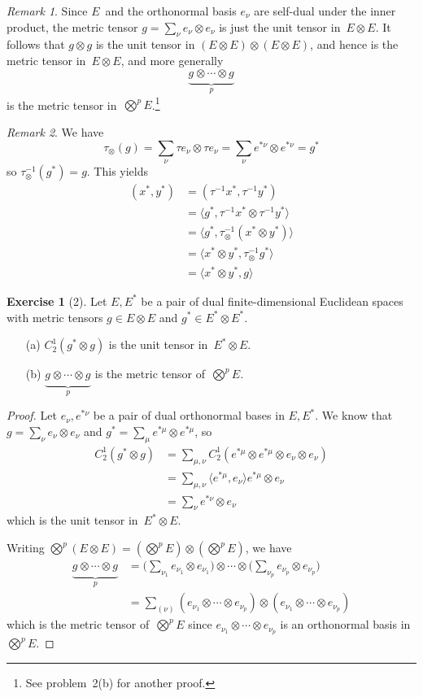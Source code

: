 \documentclass[letterpaper,12pt]{article}
\newcommand{\tprod}{\otimes}
\newcommand{\bigtprod}{\bigotimes}
\newcommand{\medtprod}{{\textstyle\bigtprod}}
\newcommand{\sprod}[2]{\langle#1,#2\rangle}
\newcommand{\iprod}[2]{(#1,#2)}
\newcommand{\multi}[4]{#2_{#3}#1\cdots#1#2_{#4}}
\newcommand{\tprods}[3]{\multi{\tprod}{#1}{#2}{#3}}
\theoremstyle{definition}
\newtheorem*{exer}{Exercise}
\theoremstyle{remark}
\newtheorem*{rmk}{Remark}
\begin{document}
\begin{rmk}
Since \(E\)~and the orthonormal basis \(e_{\nu}\) are self-dual under the inner product, the metric tensor \(g=\sum_{\nu}e_{\nu}\tprod e_{\nu}\) is just the unit tensor in~\(E\tprod E\). It follows that \(g\tprod g\) is the unit tensor in \((E\tprod E)\tprod(E\tprod E)\), and hence is the metric tensor in~\(E\tprod E\), and more generally
\[\underbrace{\tprods{g}{}{}}_p\]
is the metric tensor in~\(\medtprod^p E\).\footnote{See problem~2(b) for another proof.}
\end{rmk}

\begin{rmk}
We have
\[\tau_{\tprod}(g)=\sum_{\nu}\tau e_{\nu}\tprod\tau e_{\nu}=\sum_{\nu}e^{*\nu}\tprod e^{*\nu}=g^*\]
so \(\tau_{\tprod}^{-1}(g^*)=g\). This yields
\begin{align*}
\iprod{x^*}{y^*}&=\iprod{\tau^{-1}x^*}{\tau^{-1}y^*}\\
	&=\sprod{g^*}{\tau^{-1}x^*\tprod\tau^{-1}y^*}\\
	&=\sprod{g^*}{\tau_{\tprod}^{-1}(x^*\tprod y^*)}\\
	&=\sprod{x^*\tprod y^*}{\tau_{\tprod}^{-1}g^*}\\
	&=\sprod{x^*\tprod y^*}{g}
\end{align*}
\end{rmk}

\begin{exer}[2]
Let \(E,E^*\) be a pair of dual finite-dimensional Euclidean spaces with metric tensors \(g\in E\tprod E\) and \(g^*\in E^*\tprod E^*\).
\begin{enumerate}
\item[(a)] \(C^1_2(g^*\tprod g)\) is the unit tensor in~\(E^*\tprod E\).
\item[(b)] \(\underbrace{\tprods{g}{}{}}_p\) is the metric tensor of~\(\medtprod^p E\).
\end{enumerate}
\end{exer}
\begin{proof}
Let \(e_{\nu},e^{*\nu}\) be a pair of dual orthonormal bases in \(E,E^*\). We know that \(g=\sum_{\nu}e_{\nu}\tprod e_{\nu}\) and \(g^*=\sum_{\mu}e^{*\mu}\tprod e^{*\mu}\), so
\begin{align*}
C^1_2(g^*\tprod g)&=\sum_{\mu,\nu}C^1_2(e^{*\mu}\tprod e^{*\mu}\tprod e_{\nu}\tprod e_{\nu})\\
	&=\sum_{\mu,\nu}\sprod{e^{*\mu}}{e_{\nu}}e^{*\mu}\tprod e_{\nu}\\
	&=\sum_{\nu}e^{*\nu}\tprod e_{\nu}
\end{align*}
which is the unit tensor in~\(E^*\tprod E\).

Writing \(\medtprod^p(E\tprod E)=(\medtprod^p E)\tprod(\medtprod^p E)\), we have
\begin{align*}
\underbrace{\tprods{g}{}{}}_p&=\bigl(\sum_{\nu_1}e_{\nu_1}\tprod e_{\nu_1}\bigr)\tprod\cdots\tprod\bigl(\sum_{\nu_p}e_{\nu_p}\tprod e_{\nu_p}\bigr)\\
	&=\sum_{(\nu)}(\tprods{e}{\nu_1}{\nu_p})\tprod(\tprods{e}{\nu_1}{\nu_p})
\end{align*}
which is the metric tensor of~\(\medtprod^p E\) since \(\tprods{e}{\nu_1}{\nu_p}\) is an orthonormal basis in~\(\medtprod^p E\).
\end{proof}
\end{document}
